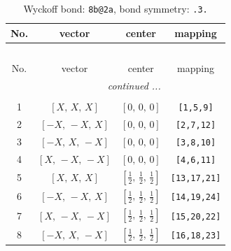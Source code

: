 \documentclass[fleqn,8pt]{jsarticle}
\begin{document}
\begin{longtable}{cccc}
\caption{Wyckoff bond: {\tt 8b@2a}, bond symmetry: {\tt .3.}}
 \\
 \hline \hline
No. & vector & center & mapping \\ \hline \endfirsthead

\multicolumn{3}{l}{\tablename\ \thetable{}} \\
 \hline \hline
No. & vector & center & mapping \\ \hline \endhead

 \hline \hline
\multicolumn{3}{r}{\footnotesize\it continued ...} \\ \endfoot

 \hline \hline
\multicolumn{3}{r}{} \\ \endlastfoot

1 & $\left[ X,\, X,\, X \right]$ & $\left[ 0,\, 0,\, 0 \right]$ & {\tt [1,5,9]} \\ \hline
2 & $\left[ - X,\, - X,\, X \right]$ & $\left[ 0,\, 0,\, 0 \right]$ & {\tt [2,7,12]} \\ \hline
3 & $\left[ - X,\, X,\, - X \right]$ & $\left[ 0,\, 0,\, 0 \right]$ & {\tt [3,8,10]} \\ \hline
4 & $\left[ X,\, - X,\, - X \right]$ & $\left[ 0,\, 0,\, 0 \right]$ & {\tt [4,6,11]} \\ \hline
5 & $\left[ X,\, X,\, X \right]$ & $\left[ \frac{1}{2},\, \frac{1}{2},\, \frac{1}{2} \right]$ & {\tt [13,17,21]} \\ \hline
6 & $\left[ - X,\, - X,\, X \right]$ & $\left[ \frac{1}{2},\, \frac{1}{2},\, \frac{1}{2} \right]$ & {\tt [14,19,24]} \\ \hline
7 & $\left[ X,\, - X,\, - X \right]$ & $\left[ \frac{1}{2},\, \frac{1}{2},\, \frac{1}{2} \right]$ & {\tt [15,20,22]} \\ \hline
8 & $\left[ - X,\, X,\, - X \right]$ & $\left[ \frac{1}{2},\, \frac{1}{2},\, \frac{1}{2} \right]$ & {\tt [16,18,23]} \\
\end{longtable}
\renewcommand{\arraystretch}{1.2}
\end{document}
